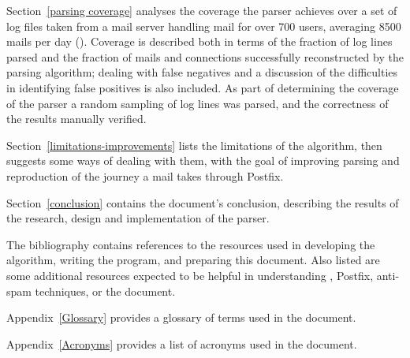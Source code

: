 Section~\ref{parsing coverage} analyses the coverage the parser achieves
over a set of \numberOFlogFILES{} log files taken from a mail server
handling mail for over 700 users, averaging 8500 mails per day
().  Coverage is described both
in terms of the fraction of log lines parsed and the fraction of mails and
connections successfully reconstructed by the parsing algorithm; dealing
with false negatives and a discussion of the difficulties in identifying
false positives is also included.  As part of determining the coverage of
the parser a random sampling of log lines was parsed, and the correctness
of the results manually verified.

Section~\ref{limitations-improvements} lists the limitations of the
algorithm, then suggests some ways of dealing with them, with the goal of
improving parsing and reproduction of the journey a mail takes through
Postfix.

Section~\ref{conclusion} contains the document's conclusion, describing the
results of the research, design and implementation of the parser.

The bibliography contains references to the resources used in developing
the algorithm, writing the program, and preparing this document.  Also
listed are some additional resources expected to be helpful in
understanding \SMTP{}, Postfix, anti-spam techniques, or the document.

Appendix~\ref{Glossary} provides a glossary of terms used in the document.

Appendix~\ref{Acronyms} provides a list of acronyms used in the document.

